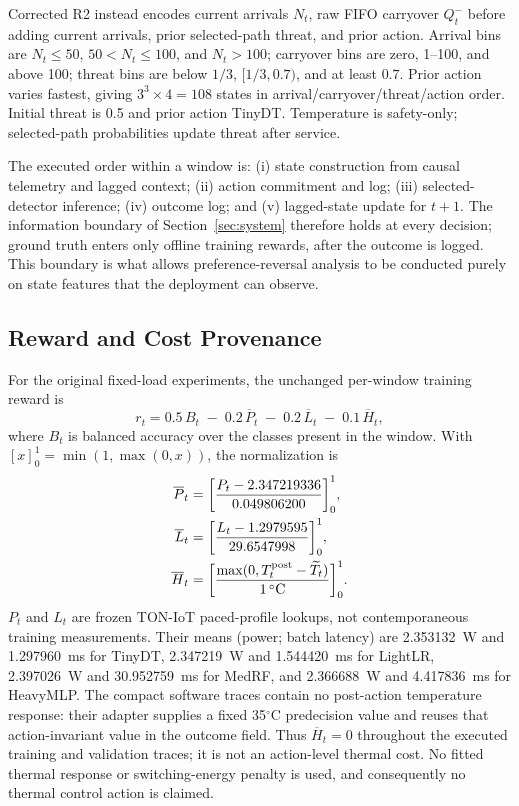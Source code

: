 Corrected R2 instead encodes current arrivals $N_t$, raw FIFO carryover $Q_t^-$ before adding current arrivals, prior selected-path threat, and prior action. Arrival bins are $N_t\leq50$, $50<N_t\leq100$, and $N_t>100$; carryover bins are zero, 1--100, and above 100; threat bins are below $1/3$, $[1/3,0.7)$, and at least $0.7$. Prior action varies fastest, giving $3^3\times4=108$ states in arrival/carryover/threat/action order. Initial threat is 0.5 and prior action TinyDT. Temperature is safety-only; selected-path probabilities update threat after service.

The executed order within a window is: (i) state construction from causal telemetry and lagged context; (ii) action commitment and log; (iii) selected-detector inference; (iv) outcome log; and (v) lagged-state update for $t+1$. The information boundary of Section~\ref{sec:system} therefore holds at every decision; ground truth enters only offline training rewards, after the outcome is logged. This boundary is what allows preference-reversal analysis to be conducted purely on state features that the deployment can observe.

\subsection{Reward and Cost Provenance}
For the original fixed-load experiments, the unchanged per-window training reward is
\begin{equation}\label{eq:reward}
    r_t = 0.5\,B_t \;-\; 0.2\,\overline P_t \;-\; 0.2\,\overline L_t \;-\; 0.1\,\overline H_t,
\end{equation}
where $B_t$ is balanced accuracy over the classes present in the window. With $[x]_0^1=\min(1,\max(0,x))$, the normalization is
\begin{align}
    \overline P_t &= \biggl[\frac{P_t-2.347219336}{0.049806200}\biggr]_0^1,\\
    \overline L_t &= \biggl[\frac{L_t-1.2979595}{29.6547998}\biggr]_0^1,\\
    \overline H_t &= \biggl[\frac{\max(0,T_t^{\rm post}-\widetilde T_t)}{1\,^{\circ}\mathrm{C}}\biggr]_0^1.
\end{align}
$P_t$ and $L_t$ are frozen TON-IoT paced-profile lookups, not contemporaneous training measurements. Their means (power; batch latency) are 2.353132~W and 1.297960~ms for TinyDT, 2.347219~W and 1.544420~ms for LightLR, 2.397026~W and 30.952759~ms for MedRF, and 2.366688~W and 4.417836~ms for HeavyMLP. The compact software traces contain no post-action temperature response: their adapter supplies a fixed 35$^{\circ}$C predecision value and reuses that action-invariant value in the outcome field. Thus $\overline H_t=0$ throughout the executed training and validation traces; it is not an action-level thermal cost. No fitted thermal response or switching-energy penalty is used, and consequently no thermal control action is claimed.

